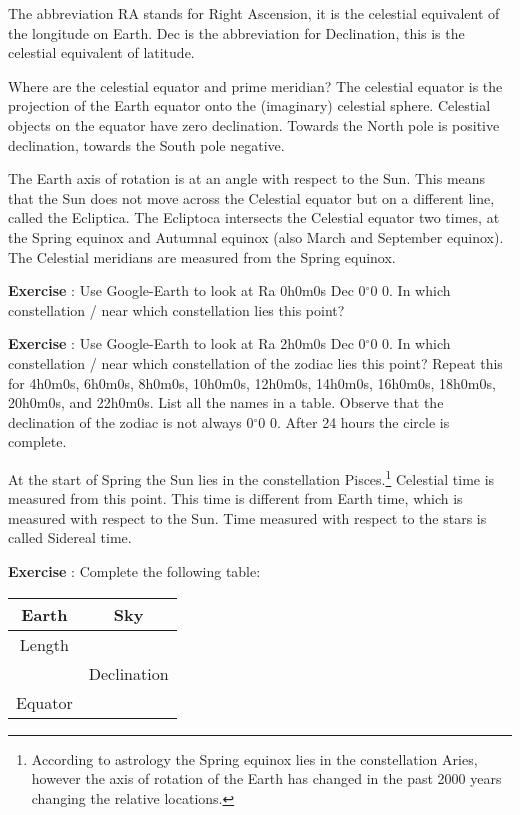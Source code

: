 The abbreviation RA stands for Right Ascension, it is the celestial equivalent of the longitude on Earth. Dec is the abbreviation for Declination, this is the celestial equivalent of latitude.

Where are the celestial equator and prime meridian? The celestial equator is the projection of the Earth  equator onto the (imaginary) celestial sphere. Celestial objects on the equator have zero declination. Towards the North pole is positive declination, towards the South pole negative.

The Earth axis of rotation is at an angle with respect to the Sun. This means that the Sun does not move across the Celestial equator but on a different line, called the Ecliptica. The Ecliptoca intersects the Celestial equator two times, at the Spring equinox and Autumnal equinox (also March and September equinox). The Celestial meridians are measured from the Spring equinox.

\begin{shaded}
\textbf{Exercise \theExercise {}} : Use Google-Earth to look at Ra 0h0m0s Dec 0$^{\circ}$0 0. In which constellation / near which constellation lies this point?\end{shaded}
\begin{shaded}
\textbf{Exercise \theExercise {}} : Use Google-Earth to look at Ra 2h0m0s Dec 0$^{\circ}$0 0. In which constellation / near which constellation of the zodiac lies this point? Repeat this for 4h0m0s, 6h0m0s, 8h0m0s, 10h0m0s, 12h0m0s, 14h0m0s, 16h0m0s, 18h0m0s, 20h0m0s, and 22h0m0s. List all the names in a table. Observe that the declination of the zodiac is not always 0$^{\circ}$0 0. After 24 hours the circle is complete.\end{shaded}

At the start of Spring the Sun lies in the constellation Pisces.\footnote{According to astrology the Spring equinox lies in the constellation Aries, however the axis of rotation of the Earth has changed in the past 2000 years changing the relative locations.} Celestial time is measured from this point. This time is different from Earth time, which is measured with respect to the Sun. Time measured with respect to the stars is called Sidereal time.

\begin{shaded}
\textbf{Exercise \theExercise {}} : Complete the following table:
\begin{tabular}{|c|c|}
\hline
\textbf{Earth} & \textbf{Sky} \\
\hline
Length &   \\
\hline
 & Declination \\
\hline
Equator & \\
\hline
\end{tabular}\end{shaded}

